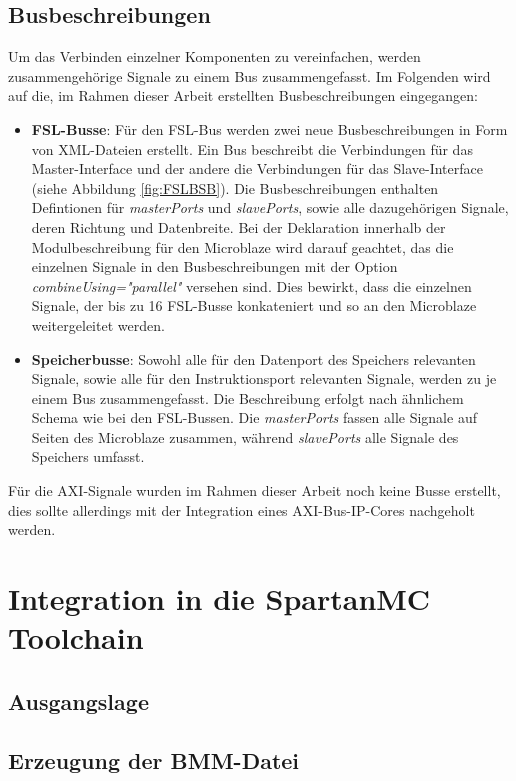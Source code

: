 \subsection{Busbeschreibungen}\label{subsec:BusDesc}
Um das Verbinden einzelner Komponenten zu vereinfachen, werden zusammengehörige Signale zu einem Bus zusammengefasst. Im Folgenden wird auf die, im Rahmen dieser Arbeit erstellten Busbeschreibungen eingegangen:
\begin{itemize}
\item \textbf{FSL-Busse}: Für den FSL-Bus werden zwei neue Busbeschreibungen in Form von XML-Dateien erstellt. Ein Bus beschreibt die Verbindungen für das Master-Interface und der andere die Verbindungen für das Slave-Interface (siehe Abbildung \ref{fig:FSLBSB}). Die Busbeschreibungen enthalten Defintionen für \textit{masterPorts} und \textit{slavePorts}, sowie alle dazugehörigen Signale, deren Richtung und Datenbreite.
Bei der Deklaration innerhalb der Modulbeschreibung für den Microblaze wird darauf geachtet, das die einzelnen Signale in den Busbeschreibungen mit der Option \textit{combineUsing="parallel"} versehen sind. Dies bewirkt, dass die einzelnen Signale, der bis zu 16 FSL-Busse konkateniert und so an den Microblaze weitergeleitet werden.
\item \textbf{Speicherbusse}: Sowohl alle für den Datenport des Speichers relevanten Signale, sowie alle für den Instruktionsport relevanten Signale, werden zu je einem Bus zusammengefasst. Die Beschreibung erfolgt nach ähnlichem Schema wie bei den FSL-Bussen. Die \textit{masterPorts} fassen alle Signale auf Seiten des Microblaze zusammen, während \textit{slavePorts} alle Signale des Speichers umfasst.
\end{itemize}
Für die AXI-Signale wurden im Rahmen dieser Arbeit noch keine Busse erstellt, dies sollte allerdings mit der Integration eines AXI-Bus-IP-Cores nachgeholt werden.

\section{Integration in die SpartanMC Toolchain}
\subsection{Ausgangslage}

\subsection{Erzeugung der BMM-Datei}


